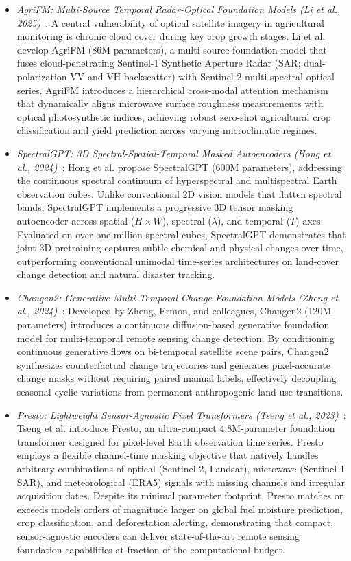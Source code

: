 \begin{itemize}[leftmargin=*]
    \item \emph{AgriFM: Multi-Source Temporal Radar-Optical Foundation Models (Li et al., 2025)}~\cite{li2025agrifm}: A central vulnerability of optical satellite imagery in agricultural monitoring is chronic cloud cover during key crop growth stages. Li et al. develop AgriFM (86M parameters), a multi-source foundation model that fuses cloud-penetrating Sentinel-1 Synthetic Aperture Radar (SAR; dual-polarization VV and VH backscatter) with Sentinel-2 multi-spectral optical series. AgriFM introduces a hierarchical cross-modal attention mechanism that dynamically aligns microwave surface roughness measurements with optical photosynthetic indices, achieving robust zero-shot agricultural crop classification and yield prediction across varying microclimatic regimes.
    \item \emph{SpectralGPT: 3D Spectral-Spatial-Temporal Masked Autoencoders (Hong et al., 2024)}~\cite{hong2024spectralgpt}: Hong et al. propose SpectralGPT (600M parameters), addressing the continuous spectral continuum of hyperspectral and multispectral Earth observation cubes. Unlike conventional 2D vision models that flatten spectral bands, SpectralGPT implements a progressive 3D tensor masking autoencoder across spatial ($H \times W$), spectral ($\lambda$), and temporal ($T$) axes. Evaluated on over one million spectral cubes, SpectralGPT demonstrates that joint 3D pretraining captures subtle chemical and physical changes over time, outperforming conventional unimodal time-series architectures on land-cover change detection and natural disaster tracking.
    \item \emph{Changen2: Generative Multi-Temporal Change Foundation Models (Zheng et al., 2024)}~\cite{zheng2024changen2}: Developed by Zheng, Ermon, and colleagues, Changen2 (120M parameters) introduces a continuous diffusion-based generative foundation model for multi-temporal remote sensing change detection. By conditioning continuous generative flows on bi-temporal satellite scene pairs, Changen2 synthesizes counterfactual change trajectories and generates pixel-accurate change masks without requiring paired manual labels, effectively decoupling seasonal cyclic variations from permanent anthropogenic land-use transitions.
    \item \emph{Presto: Lightweight Sensor-Agnostic Pixel Transformers (Tseng et al., 2023)}~\cite{tseng2023presto}: Tseng et al. introduce Presto, an ultra-compact 4.8M-parameter foundation transformer designed for pixel-level Earth observation time series. Presto employs a flexible channel-time masking objective that natively handles arbitrary combinations of optical (Sentinel-2, Landsat), microwave (Sentinel-1 SAR), and meteorological (ERA5) signals with missing channels and irregular acquisition dates. Despite its minimal parameter footprint, Presto matches or exceeds models orders of magnitude larger on global fuel moisture prediction, crop classification, and deforestation alerting, demonstrating that compact, sensor-agnostic encoders can deliver state-of-the-art remote sensing foundation capabilities at fraction of the computational budget.
\end{itemize}


